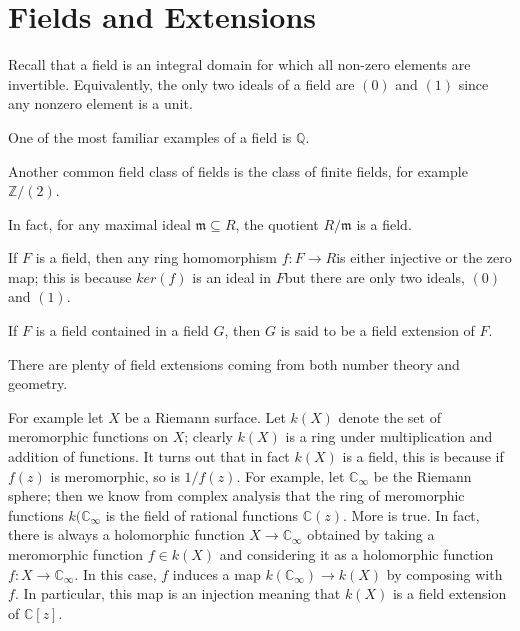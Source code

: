 \chapter{Fields and Extensions}
Recall that a field is an integral domain for which all non-zero elements are
invertible. Equivalently, the only two ideals of a field are $(0)$ and $(1)$
since any nonzero element is a unit.
\begin{example}
One of the most familiar examples of a field is $\mathbb{Q}$. \end{example}
\begin{example}
Another common field class of fields is the class of finite fields, for example
$\mathbb{Z}/(2)$.\end{example}
\begin{exercise} In fact, for any maximal ideal $\mathfrak{m}\subseteq R$, the
quotient $R/\mathfrak{m}$ is a field. \end{exercise}
\begin{example} If $F$ is a field, then any ring homomorphism $f:F\rightarrow
R$is either injective or the zero map; this is because $ker(f)$ is an ideal in
$F$but there are only two ideals, $(0)$ and $(1)$. \end{example}

\begin{definition} If $F$ is a field contained in a field $G$, then $G$ is said
to be a field extension of $F$. \end{definition}
There are plenty of field extensions coming from both number theory and
geometry.
\begin{example} For example let $X$ be a Riemann surface. Let $k(X)$ denote the
set of meromorphic functions on $X$; clearly $k(X)$ is a ring under
multiplication and addition of functions. It turns out that in fact $k(X)$ is a
field, this is because if $f(z)$ is meromorphic, so is $1/f(z)$. For example,
let $\mathbb{C}_{\infty}$ be the Riemann sphere; then we know from complex
analysis that the ring of meromorphic functions $k(\mathbb{C}_{\infty}$ is the
field of rational functions $\mathbb{C}(z)$. More is true. In fact, there is
always a holomorphic function $X\rightarrow \mathbb{C}_{\infty}$ obtained by
taking a meromorphic function $f\in k(X)$ and considering it as a holomorphic
function $f:X\rightarrow\mathbb{C}_{\infty}$. In this case, $f$ induces a map
$k(\mathbb{C}_{\infty})\rightarrow k(X)$ by composing with $f$. In particular,
this map is an injection meaning that $k(X)$ is a field extension of
$\mathbb{C}[z]$.
\end{example}

